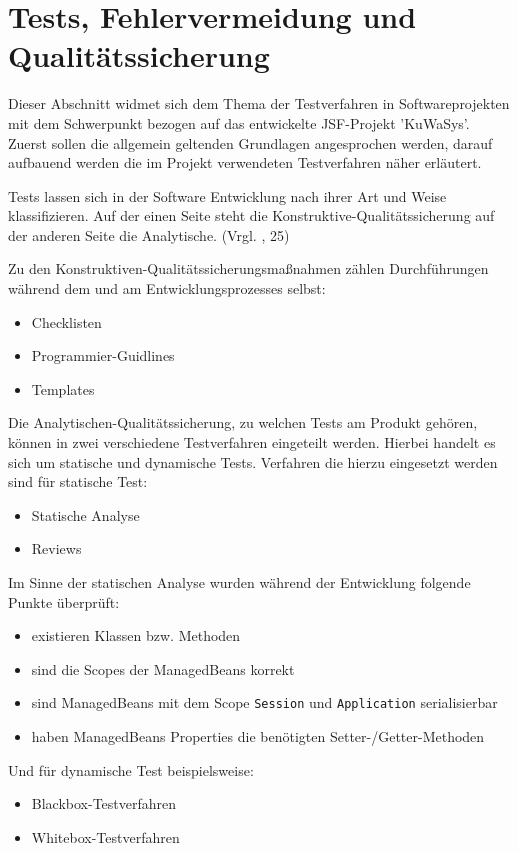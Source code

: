 \section{Tests, Fehlervermeidung und Qualitätssicherung}\label{sec:Testing und Debugging}

Dieser Abschnitt widmet sich dem Thema der Testverfahren in Softwareprojekten mit dem Schwerpunkt bezogen auf das entwickelte JSF-Projekt 'KuWaSys'.
Zuerst sollen die allgemein geltenden Grundlagen angesprochen werden, darauf aufbauend werden die im Projekt verwendeten Testverfahren näher erläutert. 

Tests lassen sich in der Software Entwicklung nach ihrer Art und Weise klassifizieren.
Auf der einen Seite steht die Konstruktive-Qualitätssicherung auf der anderen Seite die Analytische.
(Vrgl. \cite{RaM-ST}, 25) 

Zu den Konstruktiven-Qualitätssicherungsmaßnahmen zählen Durchführungen während dem und am Entwicklungsprozesses selbst:
\begin{itemize}
  \item Checklisten
  \item Programmier-Guidlines
  \item Templates
\end{itemize}

Die Analytischen-Qualitätssicherung, zu welchen Tests am Produkt gehören, können in zwei verschiedene Testverfahren eingeteilt werden. Hierbei handelt es sich um statische und dynamische Tests.
Verfahren die hierzu eingesetzt werden sind für statische Test:
\begin{itemize}
  \item Statische Analyse
  \item Reviews
\end{itemize}

Im Sinne der statischen Analyse wurden während der Entwicklung folgende Punkte überprüft:
\begin{itemize}
  \item existieren Klassen bzw. Methoden
  \item sind die Scopes der ManagedBeans korrekt
  \item sind ManagedBeans mit dem Scope \texttt{Session} und \texttt{Application} serialisierbar
  \item haben ManagedBeans Properties die benötigten Setter-/Getter-Methoden
\end{itemize}

Und für dynamische Test beispielsweise:
\begin{itemize}
  \item \gls{Blackbox}-Testverfahren
  \item \gls{Whitebox}-Testverfahren
\end{itemize}


